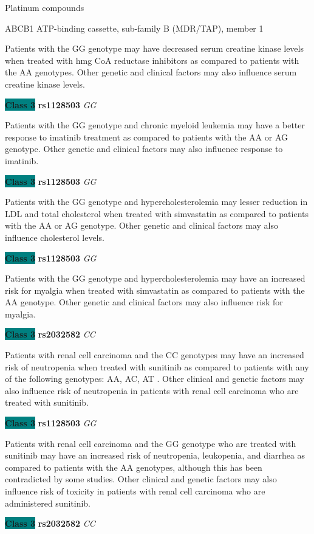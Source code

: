 \documentclass{resume} %
\begin{document}
\begin{rSection}{ Platinum compounds }
\begin{rSubsection}{ ABCB1 }{ ATP-binding cassette, sub-family B (MDR/TAP), member 1 }{}{}
\item[] Patients with the GG genotype may have decreased serum creatine kinase levels when treated with hmg CoA reductase inhibitors as compared to patients with the AA genotypes. Other genetic and clinical factors may also influence serum creatine kinase levels. \item \textbf{\colorbox{teal} {Class 3}} \textbf{ rs1128503 } \textit{ GG }
\item[] Patients with the GG genotype and chronic myeloid leukemia may have a better response to imatinib treatment as compared to patients with the AA or AG genotype. Other genetic and clinical factors may also influence response to imatinib. \item \textbf{\colorbox{teal} {Class 3}} \textbf{ rs1128503 } \textit{ GG }
\item[] Patients with the GG genotype and hypercholesterolemia may lesser reduction in LDL and total cholesterol when treated with simvastatin as compared to patients with the AA or AG genotype. Other genetic and clinical factors may also influence cholesterol levels.\item \textbf{\colorbox{teal} {Class 3}} \textbf{ rs1128503 } \textit{ GG }
\item[] Patients with the GG genotype and hypercholesterolemia may have an increased risk for myalgia when treated with simvastatin as compared to patients with the AA genotype. Other genetic and clinical factors may also influence risk for myalgia.\item \textbf{\colorbox{teal} {Class 3}} \textbf{ rs2032582 } \textit{ CC }
\item[] Patients with renal cell carcinoma and the CC genotypes may have an increased risk of neutropenia when treated with sunitinib as compared to patients with any of the following genotypes: AA, AC, AT . Other clinical and genetic factors may also influence risk of neutropenia in patients with renal cell carcinoma who are treated with sunitinib.\item \textbf{\colorbox{teal} {Class 3}} \textbf{ rs1128503 } \textit{ GG }
\item[] Patients with renal cell carcinoma and the GG genotype who are treated with sunitinib may have an increased risk of  neutropenia, leukopenia, and diarrhea as compared to patients with the AA genotypes, although this has been contradicted by some studies. Other clinical and genetic factors may also influence risk of toxicity in patients with renal cell carcinoma who are administered sunitinib.\item \textbf{\colorbox{teal} {Class 3}} \textbf{ rs2032582 } \textit{ CC }

\end{rSubsection}
\end{rSection}
\end{document}
